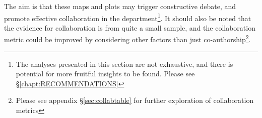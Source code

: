 
The aim is that these maps and plots may trigger constructive debate, and promote effective collaboration in the department\footnote{The analyses presented in this section are not exhaustive, and there is potential for more fruitful insights to be found. Please see \S\ref{chapt:RECOMMENDATIONS}}. It should also be noted that the evidence for collaboration is from quite a small sample, and the collaboration metric could be improved by considering other factors than just co-authorship\footnote{Please see appendix \S\ref{sec:collabtable} for further exploration of collaboration metrics}.

